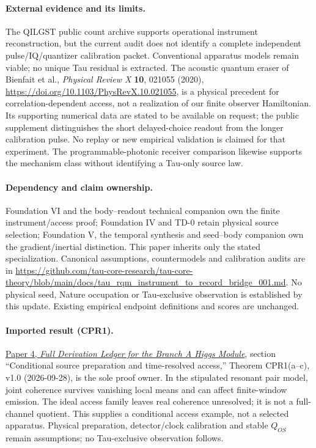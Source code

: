 \documentclass[11pt]{article}
\begin{document}
\paragraph{External evidence and its limits.}
The QILGST public count archive supports operational instrument reconstruction,
but the current audit does not identify a complete independent pulse/IQ/quantizer
calibration packet. Conventional apparatus models remain viable; no unique
Tau residual is extracted. The acoustic quantum eraser of Bienfait et al.,
\emph{Physical Review X} \textbf{10}, 021055 (2020),
\url{https://doi.org/10.1103/PhysRevX.10.021055}, is a physical precedent
for correlation-dependent access, not a realization of our finite observer
Hamiltonian. Its supporting numerical data are stated to be available on request;
the public supplement distinguishes the short delayed-choice readout from
the longer calibration pulse. No replay or new empirical validation is claimed
for that experiment. The programmable-photonic receiver comparison likewise
supports the mechanism class without identifying a Tau-only source law.

\paragraph{Dependency and claim ownership.}
Foundation VI and the body--readout technical companion own the finite instrument/access proof; Foundation IV and TD-0 retain physical source selection; Foundation V, the temporal synthesis and seed--body companion own the gradient/inertial distinction. This paper inherits only the stated specialization. Canonical assumptions, countermodels and calibration audits are in \url{https://github.com/tau-core-research/tau-core-theory/blob/main/docs/tau_rqm_instrument_to_record_bridge_001.md}. No physical seed, Nature occupation or Tau-exclusive observation is established by this update. Existing empirical endpoint definitions and scores are unchanged.

\paragraph{Imported result (CPR1).}
\href{https://github.com/tau-core-research/tau-core-higgs-module-paper4/blob/main/paper4_full_derivation/full_derivation.pdf#nameddest=cpr1}{Paper 4, \emph{Full Derivation Ledger for the Branch A Higgs Module}}, section ``Conditional source preparation and time-resolved access,'' Theorem CPR1(a--c), v1.0 (2026-09-28), is the sole proof owner.
In the stipulated resonant pair model, joint coherence survives vanishing local means and can affect finite-window emission. The ideal access family leaves real coherence unresolved; it is not a full-channel quotient. This supplies a conditional access example, not a selected apparatus.
Physical preparation, detector/clock calibration and stable $Q_{OS}$ remain assumptions; no Tau-exclusive observation follows.
\end{document}
